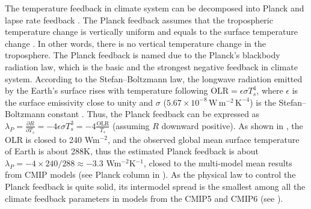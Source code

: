 The temperature feedback in climate system can be decomposed into Planck and lapse rate feedback \citep{Soden2006}. The Planck feedback    assumes that the tropospheric temperature change is vertically uniform and equals to the surface temperature change \citep{Bony2006,Soden2006}. In other words, there is no vertical temperature change in the troposphere. The Planck feedback is named due to the Planck's blackbody radiation law, which is the basic and the strongest negative feedback in climate system. According to the Stefan--Boltzmann law, the longwave radiation emitted by the Earth’s surface rises with temperature following $\text{OLR}=\epsilon\sigma T_s^4$, where $\epsilon$ is the surface emissivity close to unity and $\sigma$ ($5.67\times 10^{-8}\, \mathrm{W\, m^{-2}\,K^{-4}}$) is the Stefan--Boltzmann constant \citep{Pithan2014}. Thus, the Planck feedback can be expressed as $\lambda_P = \frac{\partial R}{\partial T_s}=-4\epsilon\sigma T_s^3=-4\frac{\text{OLR}}{T_s}$ (assuming $R$ downward positive). As shown in , the OLR is closed to 240 Wm$^{-2}$, and the observed global mean surface temperature of Earth is about 288K, thus the estimated Planck feedback is about $\lambda_P=-4\times 240/288\approx -3.3$ Wm$^{-2}$K$^{-1}$, closed to the multi-model mean results from CMIP models (see Planck column in ). As the physical law to control the Planck feedback is quite solid, its intermodel spread is the smallest among all the climate feedback parameters in models from the CMIP5 and CMIP6 (see ).


